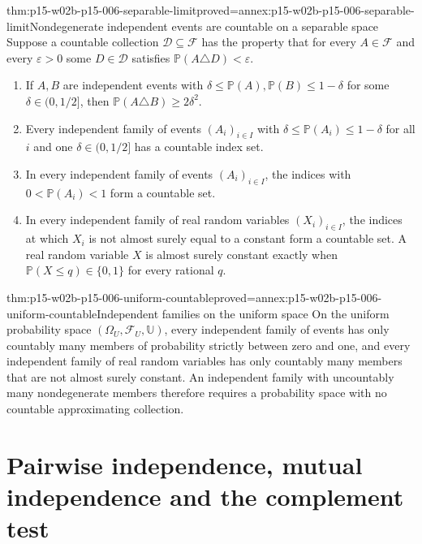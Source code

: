 \begin{hbtheorem}{thm:p15-w02b-p15-006-separable-limit}{proved=annex:p15-w02b-p15-006-separable-limit}{Nondegenerate independent events are countable on a separable space}
Suppose a countable collection \(\mathcal D\subseteq\mathcal F\) has
the property that for every \(A\in\mathcal F\) and every
\(\varepsilon>0\) some \(D\in\mathcal D\) satisfies
\(\mathbb P(A\triangle D)<\varepsilon\).
\begin{enumerate}
\item If \(A,B\) are independent events with
      \(\delta\leq\mathbb P(A),\mathbb P(B)\leq1-\delta\) for some
      \(\delta\in(0,1/2]\), then \(\mathbb P(A\triangle B)\geq2\delta^2\).
\item Every independent family of events \((A_i)_{i\in I}\) with
      \(\delta\leq\mathbb P(A_i)\leq1-\delta\) for all \(i\) and one
      \(\delta\in(0,1/2]\) has a countable index set.
\item In every independent family of events \((A_i)_{i\in I}\), the
      indices with \(0<\mathbb P(A_i)<1\) form a countable set.
\item In every independent family of real random variables
      \((X_i)_{i\in I}\), the indices at which \(X_i\) is not almost
      surely equal to a constant form a countable set. A real random
      variable \(X\) is almost surely constant exactly when
      \(\mathbb P(X\leq q)\in\{0,1\}\) for every rational \(q\).
\end{enumerate}
\end{hbtheorem}

\begin{hbcorollary}{thm:p15-w02b-p15-006-uniform-countable}{proved=annex:p15-w02b-p15-006-uniform-countable}{Independent families on the uniform space}
On the uniform probability space \((\Omega_U,\mathcal F_U,\mathbb U)\),
every independent family of events has only countably many members of
probability strictly between zero and one, and every independent family
of real random variables has only countably many members that are not
almost surely constant. An independent family with uncountably many
nondegenerate members therefore requires a probability space with no
countable approximating collection.
\end{hbcorollary}

\section{Pairwise independence, mutual independence and the complement test}
\label{sec:p15-w02b-p15-006-complement}

